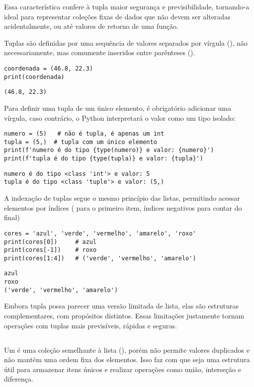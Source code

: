 Essa característica confere à tupla maior segurança e previsibilidade, tornando-a ideal para representar coleções
fixas de dados que não devem ser alteradas acidentalmente, ou até valores de retorno de uma função.

Tuplas são definidas por uma sequência de valores separados por vírgula (\inlcode{,}), não necessariamente, mas comumente
inseridos entre parênteses (\inlcode{()}).
\begin{verbatim}
coordenada = (46.8, 22.3)
print(coordenada)
\end{verbatim}
\begin{verbatim}
(46.8, 22.3)
\end{verbatim}

Para definir uma tupla de um único elemento, é obrigatório adicionar uma vírgula,
caso contrário, o Python interpretará o valor como um tipo isolado:
\begin{verbatim}
numero = (5)   # não é tupla, é apenas um int
tupla = (5,)  # tupla com um único elemento
print(f'numero é do tipo {type(numero)} e valor: {numero}')
print(f'tupla é do tipo {type(tupla)} e valor: {tupla}')
\end{verbatim}
\begin{verbatim}
numero é do tipo <class 'int'> e valor: 5
tupla é do tipo <class 'tuple'> e valor: (5,)
\end{verbatim}


A indexação de tuplas segue o mesmo princípio das listas,
permitindo acessar elementos por índices ( para o primeiro item, índices negativos para contar do final)
\begin{verbatim}
cores = 'azul', 'verde', 'vermelho', 'amarelo', 'roxo'
print(cores[0])     # azul
print(cores[-1])    # roxo
print(cores[1:4])   # ('verde', 'vermelho', 'amarelo')
\end{verbatim}
\begin{verbatim}
azul
roxo
('verde', 'vermelho', 'amarelo')
\end{verbatim}

Embora tupla possa parecer uma versão limitada de lista, elas são estruturas complementares, com propósitos distintos.
Essas limitações justamente tornam operações com tuplas mais previsíveis, rápidas e seguras.




\subsection{}
Um  é uma coleção semelhante à lista (), porém não permite valores duplicados e não mantém uma ordem fixa dos
elementos.
Isso faz com que seja uma estrutura útil para armazenar itens únicos e realizar operações como união,
interseção e diferença.

